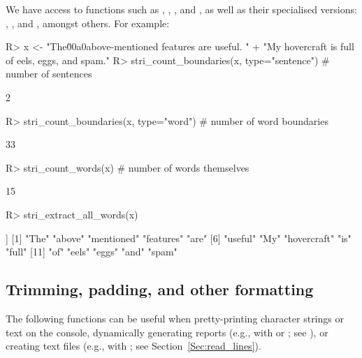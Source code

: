 \documentclass[nojss]{jss}\usepackage[]{graphicx}\usepackage[]{color}
\begin{document}
We have access to functions such as
,
,
, and
,
as well as their specialised
versions:
,
, and
, amongst others.
For example:


\begin{Schunk}
\begin{Sinput}
R> x <- "The\u00a0above-mentioned    features are useful. " %s+%
+    "My hovercraft is full of eels, eggs, and spam."
R> stri_count_boundaries(x, type="sentence")  # number of sentences
\end{Sinput}
\begin{Soutput}
[1] 2
\end{Soutput}
\begin{Sinput}
R> stri_count_boundaries(x, type="word")  # number of word boundaries
\end{Sinput}
\begin{Soutput}
[1] 33
\end{Soutput}
\begin{Sinput}
R> stri_count_words(x)                    # number of words themselves
\end{Sinput}
\begin{Soutput}
[1] 15
\end{Soutput}
\begin{Sinput}
R> stri_extract_all_words(x)
\end{Sinput}
\begin{Soutput}
[[1]]
 [1] "The"        "above"      "mentioned"  "features"   "are"
 [6] "useful"     "My"         "hovercraft" "is"         "full"
[11] "of"         "eels"       "eggs"       "and"        "spam"
\end{Soutput}
\end{Schunk}





\subsection{Trimming, padding, and other formatting}

The following functions can be useful when pretty-printing
character strings or text on the console,
dynamically generating reports (e.g.,
with  or ; see \citealp{knitr}), or creating text files
(e.g., with ; see Section~\ref{Sec:read_lines}).
\end{document}
